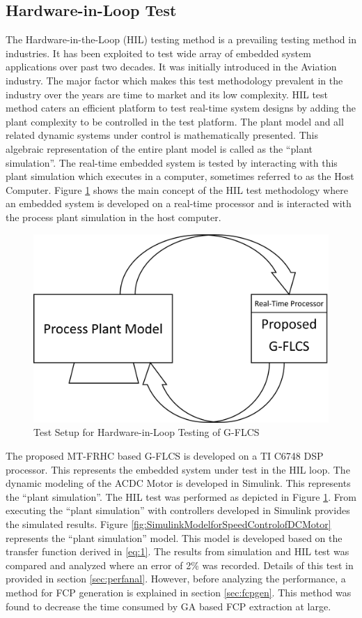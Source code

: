 \subsection{Hardware-in-Loop Test} \label{sec:hil}
The Hardware-in-the-Loop (HIL) testing method is a prevailing testing method in industries. It has been exploited to test wide array of embedded system applications over past two decades. It was initially introduced in the Aviation industry. The major factor which makes this test methodology prevalent in the industry over the years are time to market and its low complexity. HIL test method caters an efficient platform to test real-time system designs by adding the plant complexity to be controlled in the test platform. The plant model and all related dynamic systems under control is mathematically presented. This algebraic representation of the entire plant model is called as the ``plant simulation''. The real-time embedded system is tested by interacting with this plant simulation which executes in a computer, sometimes referred to as the Host Computer. Figure \ref{fig:HIL} shows the main concept of the HIL test methodology where an embedded system is developed on a real-time processor and is interacted with the process plant simulation in the host computer.

\begin{figure}[h!]
\centering
\includegraphics[width=0.9\linewidth]{Chapter4/chapter4/HIL}
\caption{Test Setup for Hardware-in-Loop Testing of G-FLCS}
\label{fig:HIL}
\end{figure}

The proposed MT-FRHC based G-FLCS is developed on a TI C6748 DSP processor. This represents the embedded system under test in the HIL loop. The dynamic modeling of the ACDC Motor is developed in Simulink. This represents the ``plant simulation''. The HIL test was performed as depicted in Figure \ref{fig:HIL}. From executing the ``plant simulation'' with controllers developed in Simulink provides the simulated results. Figure \ref{fig:SimulinkModelforSpeedControlofDCMotor} represents the ``plant simulation'' model. This model is developed based on the transfer function derived in \eqref{eq:1}. The results from simulation and HIL test was compared and analyzed where an error of 2\% was recorded. Details of this test in provided in section \ref{sec:perfanal}. However, before analyzing the performance, a method for FCP generation is explained in section \ref{sec:fcpgen}. This method was found to decrease the time consumed by GA based FCP extraction at large.  


